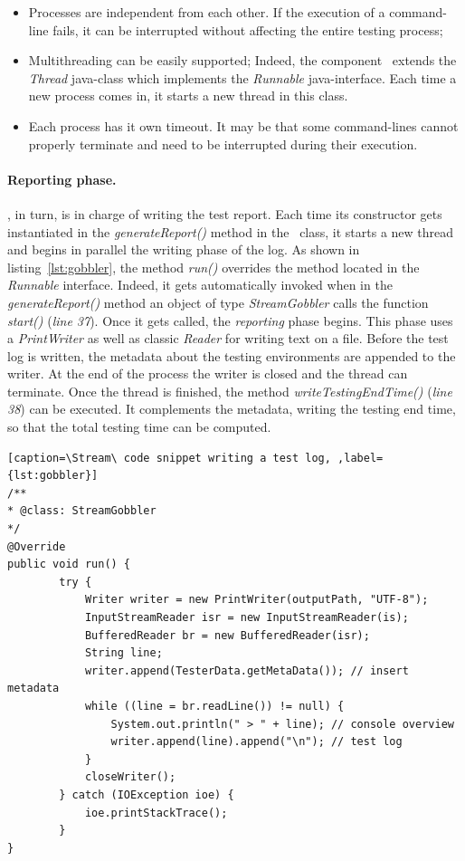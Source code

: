\begin{itemize}
\item Processes are independent from each other. 
If the execution of a command-line fails, it can be interrupted without affecting the entire testing process; 
\item Multithreading can be easily supported; Indeed, the component \Stream\ extends the \textit{Thread} java-class which implements the \textit{Runnable} java-interface. Each time a new process comes in, it starts a new thread in this class.
\item Each process has it own timeout. It may be that some command-lines cannot properly terminate and need to be interrupted during their execution.  
\end{itemize}
\paragraph{Reporting phase.}
\Stream, in turn, is in charge of writing the test report. Each time its constructor gets instantiated in the \textit{generateReport()} method in the \Cmd\ class, it starts a new thread and begins in parallel the writing phase of the log. 
As shown in listing~\ref{lst:gobbler}, the method \textit{run()} overrides the method located in the \textit{Runnable} interface. 
Indeed, it gets automatically invoked when in the \textit{generateReport()} method an object of type \textit{StreamGobbler} calls the function \textit{start()}  (\textit{line 37}). 
Once it gets called, the \textit{reporting} phase begins. This phase uses a \textit{PrintWriter} as well as classic \textit{Reader} for writing text on a file.
Before the test log is written, the metadata about the testing environments are appended to the writer. At the end of the process the writer is closed and the thread can terminate. Once the thread is finished, the method \textit{writeTestingEndTime()} (\textit{line 38}) can be executed.  
It complements the metadata, writing the testing end time, so that the total testing time can be computed. 





\begin{lstlisting}[caption=\Stream\ code snippet writing a test log, ,label={lst:gobbler}]
/**
* @class: StreamGobbler
*/
@Override
public void run() {
        try {
            Writer writer = new PrintWriter(outputPath, "UTF-8");
            InputStreamReader isr = new InputStreamReader(is);
            BufferedReader br = new BufferedReader(isr);
            String line;
            writer.append(TesterData.getMetaData()); // insert metadata
            while ((line = br.readLine()) != null) {
                System.out.println(" > " + line); // console overview
                writer.append(line).append("\n"); // test log 
            }
            closeWriter();
        } catch (IOException ioe) {
            ioe.printStackTrace();
        }
}
\end{lstlisting}


